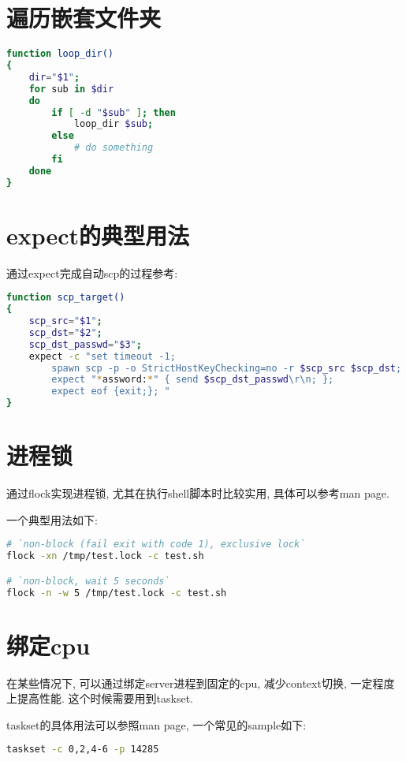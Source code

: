\section {\ZHH 遍历嵌套文件夹} {
\begin{lstlisting}[language=bash]
function loop_dir()
{
    dir="$1";
    for sub in $dir
    do
        if [ -d "$sub" ]; then
            loop_dir $sub;
        else
            # do something
        fi
    done
}
\end{lstlisting}
}


\section {\ZHH expect的典型用法} {
    {通过expect完成自动scp的过程参考: }\par
\begin{lstlisting}[language=bash]
function scp_target()
{
    scp_src="$1";
    scp_dst="$2";
    scp_dst_passwd="$3";
    expect -c "set timeout -1;
        spawn scp -p -o StrictHostKeyChecking=no -r $scp_src $scp_dst;
        expect "*assword:*" { send $scp_dst_passwd\r\n; }; 
        expect eof {exit;}; "
}
\end{lstlisting}
}

\section {\ZHH 进程锁} {
    {通过flock实现进程锁, 尤其在执行shell脚本时比较实用, 具体可以参考man page. }\par
    {一个典型用法如下: }\par
\begin{lstlisting}[language=bash]
# `non-block (fail exit with code 1), exclusive lock`
flock -xn /tmp/test.lock -c test.sh

# `non-block, wait 5 seconds`
flock -n -w 5 /tmp/test.lock -c test.sh
\end{lstlisting}
}

\section {\ZHH 绑定cpu} {
    {在某些情况下, 可以通过绑定server进程到固定的cpu, 减少context切换, 一定程度上提高性能. 这个时候需要用到taskset.}\par
    {taskset的具体用法可以参照man page, 一个常见的sample如下: }\par
\begin{lstlisting}[language=bash]
taskset -c 0,2,4-6 -p 14285
\end{lstlisting}\par
}


